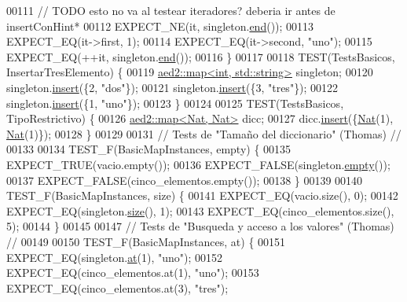 \begin{DoxyCode}
00111     \textcolor{comment}{// TODO esto no va al testear iteradores? deberia ir antes de
       insertConHint*}
00112     EXPECT\_NE(it, singleton.\hyperlink{classaed2_1_1map_a76023e6a56cb625513e1b5ea028bf983_a76023e6a56cb625513e1b5ea028bf983}{end}());
00113     EXPECT\_EQ(it->first, 1);
00114     EXPECT\_EQ(it->second, \textcolor{stringliteral}{"uno"});
00115     EXPECT\_EQ(++it, singleton.\hyperlink{classaed2_1_1map_a76023e6a56cb625513e1b5ea028bf983_a76023e6a56cb625513e1b5ea028bf983}{end}());
00116 \}
00117 
00118 TEST(TestsBasicos, InsertarTresElemento) \{
00119     \hyperlink{classaed2_1_1map}{aed2::map<int, std::string>} singleton;
00120     singleton.\hyperlink{classaed2_1_1map_a60aacba06b1579630b3c8e996cf248c8_a60aacba06b1579630b3c8e996cf248c8}{insert}(\{2, \textcolor{stringliteral}{"dos"}\});
00121     singleton.\hyperlink{classaed2_1_1map_a60aacba06b1579630b3c8e996cf248c8_a60aacba06b1579630b3c8e996cf248c8}{insert}(\{3, \textcolor{stringliteral}{"tres"}\});
00122     singleton.\hyperlink{classaed2_1_1map_a60aacba06b1579630b3c8e996cf248c8_a60aacba06b1579630b3c8e996cf248c8}{insert}(\{1, \textcolor{stringliteral}{"uno"}\});
00123 \}
00124 
00125 TEST(TestsBasicos, TipoRestrictivo) \{
00126     \hyperlink{classaed2_1_1map}{aed2::map<Nat, Nat>} dicc;
00127     dicc.\hyperlink{classaed2_1_1map_a60aacba06b1579630b3c8e996cf248c8_a60aacba06b1579630b3c8e996cf248c8}{insert}(\{\hyperlink{classNat}{Nat}(1), \hyperlink{classNat}{Nat}(1)\});
00128 \}
00129 
00131 \textcolor{comment}{// Tests de "Tamaño del diccionario" (Thomas) //}
00133 \textcolor{comment}{}
00134 TEST\_F(BasicMapInstances, empty) \{
00135     EXPECT\_TRUE(vacio.empty());
00136     EXPECT\_FALSE(singleton.\hyperlink{classaed2_1_1map_af5320ca0a7df4d16015441d5d055a7ee_af5320ca0a7df4d16015441d5d055a7ee}{empty}());
00137     EXPECT\_FALSE(cinco\_elementos.empty());
00138 \}
00139 
00140 TEST\_F(BasicMapInstances, size) \{
00141     EXPECT\_EQ(vacio.size(), 0);
00142     EXPECT\_EQ(singleton.\hyperlink{classaed2_1_1map_a89f2613f926ac13293eafe65889d6021_a89f2613f926ac13293eafe65889d6021}{size}(), 1);
00143     EXPECT\_EQ(cinco\_elementos.size(), 5);
00144 \}
00145 
00147 \textcolor{comment}{// Tests de "Busqueda y acceso a los valores" (Thomas) //}
00149 \textcolor{comment}{}
00150 TEST\_F(BasicMapInstances, at) \{
00151     EXPECT\_EQ(singleton.\hyperlink{classaed2_1_1map_a0b0a11f906da2926f9eb342fcee79fd7_a0b0a11f906da2926f9eb342fcee79fd7}{at}(1), \textcolor{stringliteral}{"uno"});
00152     EXPECT\_EQ(cinco\_elementos.at(1), \textcolor{stringliteral}{"uno"});
00153     EXPECT\_EQ(cinco\_elementos.at(3), \textcolor{stringliteral}{"tres"});

\end{DoxyCode}
